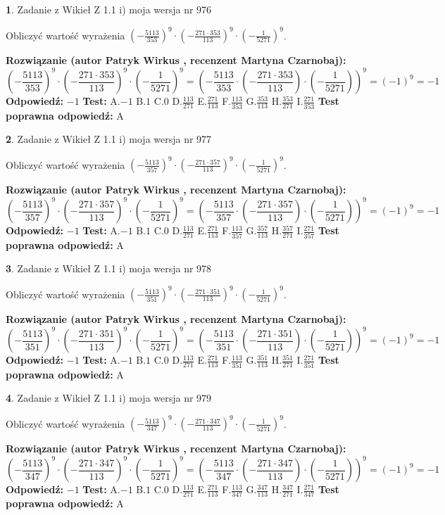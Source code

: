 \documentclass[12pt, a4paper]{article}
\theoremstyle{definition} %
\newtheorem{zad}{}
\newcommand{\zadStart}[1]{\begin{zad}#1\newline}
\newcommand{\zadStop}{\end{zad}}
\newcommand{\rozwStart}[2]{\noindent \textbf{Rozwiązanie (autor #1 , recenzent #2): }\newline}
\newcommand{\rozwStop}{\newline}
\newcommand{\odpStart}{\noindent \textbf{Odpowiedź:}\newline}
\newcommand{\odpStop}{\newline}
\newcommand{\testStart}{\noindent \textbf{Test:}\newline}
\newcommand{\testStop}{\newline}
\newcommand{\kluczStart}{\noindent \textbf{Test poprawna odpowiedź:}\newline}
\newcommand{\kluczStop}{\newline}
\begin{document}
\zadStart{Zadanie z Wikieł Z 1.1 i) moja wersja nr 976}

Obliczyć wartość wyrażenia $(-\frac{5113}{353})^{9} \cdot (-\frac{271 \cdot 353}{113})^{9} \cdot (-\frac{1}{5271})^{9}$.
\zadStop
\rozwStart{Patryk Wirkus}{Martyna Czarnobaj}
$$(-\frac{5113}{353})^{9} \cdot (-\frac{271 \cdot 353}{113})^{9} \cdot (-\frac{1}{5271})^{9} = (-\frac{5113}{353} \cdot (-\frac{271 \cdot 353}{113}) \cdot (-\frac{1}{5271}))^{9} = (-1)^{9} = -1$$
\rozwStop
\odpStart
$-1$
\odpStop
\testStart
A.$-1$ B.$1$ C.$0$ D.$\frac{113}{271}$ E.$\frac{271}{113}$
F.$\frac{113}{353}$ G.$\frac{353}{113}$
H.$\frac{353}{271}$
I.$\frac{271}{353}$
\testStop
\kluczStart
A
\kluczStop



\zadStart{Zadanie z Wikieł Z 1.1 i) moja wersja nr 977}

Obliczyć wartość wyrażenia $(-\frac{5113}{357})^{9} \cdot (-\frac{271 \cdot 357}{113})^{9} \cdot (-\frac{1}{5271})^{9}$.
\zadStop
\rozwStart{Patryk Wirkus}{Martyna Czarnobaj}
$$(-\frac{5113}{357})^{9} \cdot (-\frac{271 \cdot 357}{113})^{9} \cdot (-\frac{1}{5271})^{9} = (-\frac{5113}{357} \cdot (-\frac{271 \cdot 357}{113}) \cdot (-\frac{1}{5271}))^{9} = (-1)^{9} = -1$$
\rozwStop
\odpStart
$-1$
\odpStop
\testStart
A.$-1$ B.$1$ C.$0$ D.$\frac{113}{271}$ E.$\frac{271}{113}$
F.$\frac{113}{357}$ G.$\frac{357}{113}$
H.$\frac{357}{271}$
I.$\frac{271}{357}$
\testStop
\kluczStart
A
\kluczStop



\zadStart{Zadanie z Wikieł Z 1.1 i) moja wersja nr 978}

Obliczyć wartość wyrażenia $(-\frac{5113}{351})^{9} \cdot (-\frac{271 \cdot 351}{113})^{9} \cdot (-\frac{1}{5271})^{9}$.
\zadStop
\rozwStart{Patryk Wirkus}{Martyna Czarnobaj}
$$(-\frac{5113}{351})^{9} \cdot (-\frac{271 \cdot 351}{113})^{9} \cdot (-\frac{1}{5271})^{9} = (-\frac{5113}{351} \cdot (-\frac{271 \cdot 351}{113}) \cdot (-\frac{1}{5271}))^{9} = (-1)^{9} = -1$$
\rozwStop
\odpStart
$-1$
\odpStop
\testStart
A.$-1$ B.$1$ C.$0$ D.$\frac{113}{271}$ E.$\frac{271}{113}$
F.$\frac{113}{351}$ G.$\frac{351}{113}$
H.$\frac{351}{271}$
I.$\frac{271}{351}$
\testStop
\kluczStart
A
\kluczStop



\zadStart{Zadanie z Wikieł Z 1.1 i) moja wersja nr 979}

Obliczyć wartość wyrażenia $(-\frac{5113}{347})^{9} \cdot (-\frac{271 \cdot 347}{113})^{9} \cdot (-\frac{1}{5271})^{9}$.
\zadStop
\rozwStart{Patryk Wirkus}{Martyna Czarnobaj}
$$(-\frac{5113}{347})^{9} \cdot (-\frac{271 \cdot 347}{113})^{9} \cdot (-\frac{1}{5271})^{9} = (-\frac{5113}{347} \cdot (-\frac{271 \cdot 347}{113}) \cdot (-\frac{1}{5271}))^{9} = (-1)^{9} = -1$$
\rozwStop
\odpStart
$-1$
\odpStop
\testStart
A.$-1$ B.$1$ C.$0$ D.$\frac{113}{271}$ E.$\frac{271}{113}$
F.$\frac{113}{347}$ G.$\frac{347}{113}$
H.$\frac{347}{271}$
I.$\frac{271}{347}$
\testStop
\kluczStart
A
\kluczStop
\end{document}
